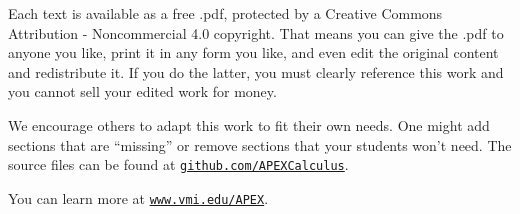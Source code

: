 Each text is available as a free .pdf, protected by a Creative Commons Attribution - Noncommercial 4.0 copyright. That  means you can give the .pdf to anyone you like, print it in any form you like, and even edit the original content and redistribute it. If you do the latter, you must  clearly reference this work and you cannot sell your edited work for money.

We encourage others to adapt this work to fit their own needs. One might add sections that are ``missing'' or remove sections that your students won't need. The source files can be found at \texttt{\href{https://github.com/APEXCalculus}{github.com/APEXCalculus}}.

You can learn more at \texttt{\href{http://www.vmi.edu/APEX}{www.vmi.edu/APEX}}.
\thispagestyle{empty}

